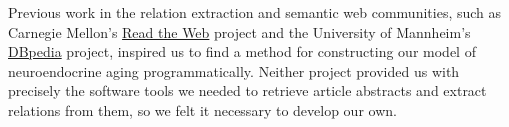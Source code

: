 Previous work in the relation extraction and semantic web communities, such as Carnegie Mellon's
\href{http://rtw.ml.cmu.edu/rtw/}{Read the Web} project and the University of Mannheim's
\href{http://dbpedia.org/}{DBpedia} project, inspired us to find a method for constructing
our model of neuroendocrine aging programmatically. Neither project provided us with precisely
the software tools we needed to retrieve article abstracts and extract relations from them,
so we felt it necessary to develop our own.

